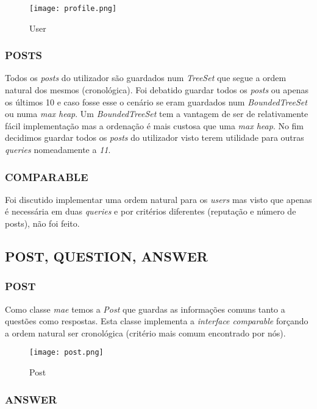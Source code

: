 \documentclass[letterpaper, 10 pt, conference]{IEEEtran} %
\begin{document}
\begin{figure}[h!]
  \centering
  \texttt{[image: profile.png]}
   \caption{User}
\end{figure}



\subsubsection{POSTS}


Todos os \textit{posts} do utilizador são guardados num \textit{TreeSet} que segue a ordem natural dos mesmos (cronológica).
Foi debatido guardar todos os \textit{posts} ou apenas os últimos 10 e caso fosse esse o cenário se eram guardados num \textit{BoundedTreeSet} ou numa \textit{max heap}.
Um \textit{BoundedTreeSet} tem a vantagem de ser de relativamente fácil implementação mas a ordenação é mais custosa que uma \textit{max heap}.
No fim decidimos guardar todos os \textit{posts} do utilizador visto terem utilidade para outras \textit{queries} nomeadamente a \textit{11}.

\subsubsection{COMPARABLE}

Foi discutido implementar uma ordem natural para os \textit{users} mas visto que apenas é necessária em duas \textit{queries} e por critérios diferentes (reputação e número de posts), não foi feito.

\subsection{POST, QUESTION, ANSWER}

\subsubsection{POST}
Como classe \textit{mae} temos a \textit{Post} que guardas as informações comuns tanto a questões como respostas. Esta classe implementa a \textit{interface comparable} forçando a ordem natural ser cronológica (critério mais comum encontrado por nós).

\begin{figure}[h!]
  \centering
  \texttt{[image: post.png]}
   \caption{Post}
\end{figure}

\subsubsection{ANSWER}
\end{document}
